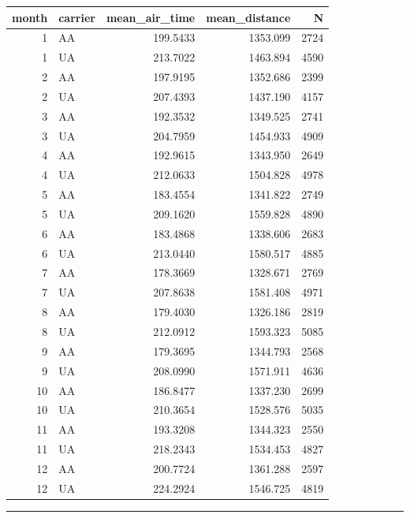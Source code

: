\documentclass[
  letterpaper,
  DIV=11]{scrartcl}
\begin{document}
\begin{table}
\centering\begingroup\fontsize{20}{22}\selectfont

\begin{tabular}{r|l|r|r|r}
\hline
month & carrier & mean\_air\_time & mean\_distance & N\\
\hline
1 & AA & 199.5433 & 1353.099 & 2724\\
\hline
1 & UA & 213.7022 & 1463.894 & 4590\\
\hline
2 & AA & 197.9195 & 1352.686 & 2399\\
\hline
2 & UA & 207.4393 & 1437.190 & 4157\\
\hline
3 & AA & 192.3532 & 1349.525 & 2741\\
\hline
3 & UA & 204.7959 & 1454.933 & 4909\\
\hline
4 & AA & 192.9615 & 1343.950 & 2649\\
\hline
4 & UA & 212.0633 & 1504.828 & 4978\\
\hline
5 & AA & 183.4554 & 1341.822 & 2749\\
\hline
5 & UA & 209.1620 & 1559.828 & 4890\\
\hline
6 & AA & 183.4868 & 1338.606 & 2683\\
\hline
6 & UA & 213.0440 & 1580.517 & 4885\\
\hline
7 & AA & 178.3669 & 1328.671 & 2769\\
\hline
7 & UA & 207.8638 & 1581.408 & 4971\\
\hline
8 & AA & 179.4030 & 1326.186 & 2819\\
\hline
8 & UA & 212.0912 & 1593.323 & 5085\\
\hline
9 & AA & 179.3695 & 1344.793 & 2568\\
\hline
9 & UA & 208.0990 & 1571.911 & 4636\\
\hline
10 & AA & 186.8477 & 1337.230 & 2699\\
\hline
10 & UA & 210.3654 & 1528.576 & 5035\\
\hline
11 & AA & 193.3208 & 1344.323 & 2550\\
\hline
11 & UA & 218.2343 & 1534.453 & 4827\\
\hline
12 & AA & 200.7724 & 1361.288 & 2597\\
\hline
12 & UA & 224.2924 & 1546.725 & 4819\\
\hline
\end{tabular}
\endgroup{}
\end{table}

\begin{center}\rule{0.5\linewidth}{0.5pt}\end{center}
\end{document}
